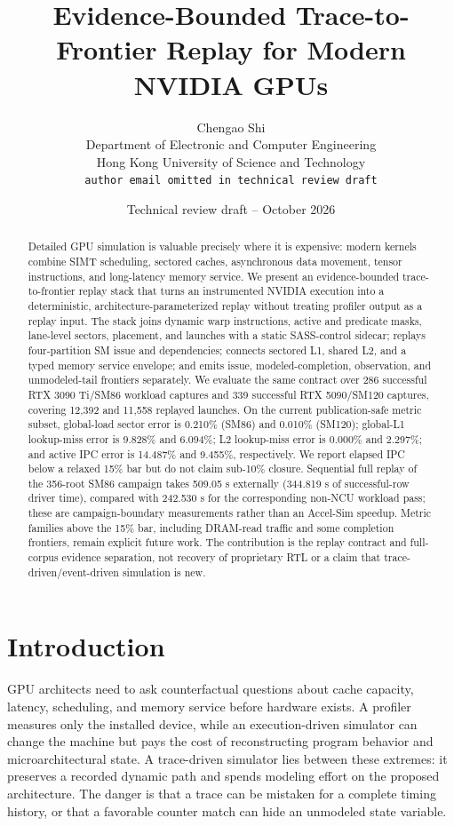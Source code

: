 \documentclass[10pt,letterpaper]{article}
\title{Evidence-Bounded Trace-to-Frontier Replay for Modern NVIDIA GPUs}
\author{Chengao Shi\\
Department of Electronic and Computer Engineering\\
Hong Kong University of Science and Technology\\
\texttt{author email omitted in technical review draft}}
\date{Technical review draft -- October 2026}
\begin{document}
\maketitle

\begin{abstract}
Detailed GPU simulation is valuable precisely where it is expensive: modern
kernels combine SIMT scheduling, sectored caches, asynchronous data movement,
tensor instructions, and long-latency memory service.  We present an
evidence-bounded trace-to-frontier replay stack that turns an instrumented
NVIDIA execution into a deterministic, architecture-parameterized replay
without treating profiler output as a replay input.  The stack joins dynamic
warp instructions, active and predicate masks, lane-level sectors, placement,
and launches with a static SASS-control sidecar; replays four-partition SM
issue and dependencies; connects sectored L1, shared L2, and a typed memory
service envelope; and emits issue, modeled-completion, observation, and
unmodeled-tail frontiers separately.  We evaluate the same contract over 286
successful RTX 3090 Ti/SM86 workload captures and 339 successful
RTX 5090/SM120 captures, covering 12,392 and 11,558 replayed launches.
On the current publication-safe metric subset, global-load sector error is
0.210\% (SM86) and 0.010\% (SM120); global-L1 lookup-miss error is 9.828\% and
6.094\%; L2 lookup-miss error is 0.000\% and 2.297\%; and active IPC error is
14.487\% and 9.455\%, respectively.  We report elapsed IPC below a relaxed 15\%
bar but do not claim sub-10\% closure.  Sequential full replay of the 356-root
SM86 campaign takes 509.05 s externally (344.819 s of successful-row driver
time), compared with 242.530 s for the corresponding non-NCU workload pass;
these are campaign-boundary measurements rather than an Accel-Sim speedup.
Metric families above the 15\% bar, including DRAM-read traffic and some
completion frontiers, remain explicit future work.  The contribution is the
replay contract and full-corpus evidence separation, not recovery of
proprietary RTL or a claim that trace-driven/event-driven simulation is new.
\end{abstract}

\section{Introduction}
\label{sec:intro}

GPU architects need to ask counterfactual questions about cache capacity,
latency, scheduling, and memory service before hardware exists.  A profiler
measures only the installed device, while an execution-driven simulator can
change the machine but pays the cost of reconstructing program behavior and
microarchitectural state.  A trace-driven simulator lies between these
extremes: it preserves a recorded dynamic path and spends modeling effort on
the proposed architecture.  The danger is that a trace can be mistaken for a
complete timing history, or that a favorable counter match can hide an
unmodeled state variable.
\end{document}
